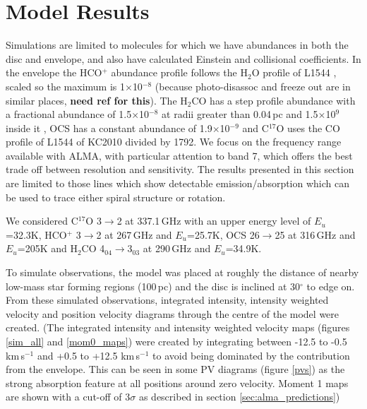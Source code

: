 \documentclass[useAMS,usenatbib]{mn2e}
\begin{document}
\section{Model Results} \label{sec:model_results}

Simulations are limited to molecules for which we have abundances in both the disc and envelope, and also have calculated Einstein and collisional coefficients. In the envelope the HCO$^+$ abundance profile follows the H$_2$O profile of L1544 \citep{Caselli2012}, scaled so the maximum is 1$\times$10$^{-8}$ (because photo-disassoc and freeze out are in similar places, {\bf need ref for this}). The H$_2$CO has a step profile abundance with a fractional abundance of 1.5$\times$10$^{-8}$ at radii greater than 0.04$\,$pc and 1.5$\times$10$^{9}$ inside it \citep{Young2004}, OCS has a constant abundance of 1.9$\times$10$^{-9}$ \citep{Ren2011} and C$^{17}$O uses the CO profile of L1544 of KC2010 divided by 1792. We focus on the frequency range available with ALMA, with particular attention to band 7, which offers the best trade off between resolution and sensitivity. The results presented in this section are limited to those lines which show detectable emission/absorption which can be used to trace either spiral structure or rotation.\newline

We considered C$^{17}$O 3$\rightarrow$2 at 337.1$\,$GHz with an upper energy level of $E_u$=32.3K, HCO$^+$ 3$\rightarrow$2 at 267$\,$GHz and $E_u$=25.7K, OCS 26$\rightarrow$25 at 316$\,$GHz and $E_u$=205K and H$_2$CO 4$_{04}\rightarrow$3$_{03}$ at 290$\,$GHz and $E_u$=34.9K.\newline

To simulate observations, the model was placed at roughly the distance of nearby low-mass star forming regions (100$\,$pc) and the disc is inclined at 30$^\circ$ to edge on. From these simulated observations, integrated intensity, intensity weighted velocity and position velocity diagrams through the centre of the model were created.
(The integrated intensity and intensity weighted velocity maps (figures \ref{sim_all} and \ref{mom0_maps}) were created by integrating between -12.5 to -0.5 km$\,$s$^{-1}$ and +0.5 to +12.5 km$\,$s$^{-1}$ to avoid being dominated by the contribution from the envelope. This can be seen in some PV diagrams  (figure \ref{pvs}) as the strong absorption feature at all positions around zero velocity. Moment 1 maps are shown with a cut-off of 3$\sigma$ as described in section \ref{sec:alma_predictions})\newline
\end{document}

